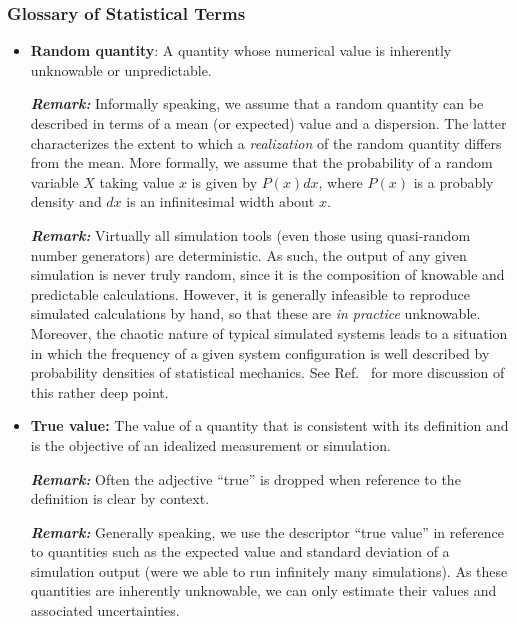 \subsubsection{Glossary of Statistical Terms}
\begin{itemize}

\item {\bf Random quantity}: A quantity whose numerical value is inherently unknowable or unpredictable.

\smallskip

\textbf{\textit{Remark:}}  Informally speaking, we assume that a random quantity can be described in terms of a mean (or expected) value and a dispersion.  The latter characterizes the extent to which a {\it realization} of the random quantity differs from the mean.  More formally, we assume that the probability of a random variable $X$ taking value $x$ is given by $P(x)dx$, where $P(x)$ is a probably density and $dx$ is an infinitesimal width about $x$.

\smallskip

\textbf{\textit{Remark:}} Virtually all simulation tools (even those using quasi-random number generators) are deterministic.  As such, the output of any given simulation is never truly random, since it is the composition of knowable and predictable calculations.  However, it is generally infeasible to reproduce simulated calculations by hand, so that these are {\it in practice} unknowable.  Moreover, the chaotic nature of typical simulated systems leads to a situation in which the frequency of a given system configuration is well described by probability densities of statistical mechanics.  See Ref.~\cite{Leimkuhler} for more discussion of this rather deep point.

\item {\bf True value:}  The value of a quantity that is consistent with its definition and is the objective of an idealized measurement or simulation.

\smallskip
\textbf{\textit{Remark:}} Often the adjective ``true'' is dropped when reference to the definition is clear by context. \citep{JCGM:GUM2008,JCGM:VIM2012}
\smallskip

\textbf{\textit{Remark:}} Generally speaking, we use the descriptor ``true value'' in reference to quantities such as the expected value and standard deviation of a simulation output (were we able to run infinitely many simulations).
As these quantities are inherently unknowable, we can only estimate their values and associated uncertainties.


\end{itemize}
